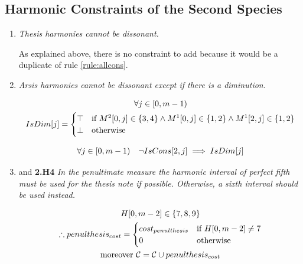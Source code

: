 \subsection*{Harmonic Constraints of the Second Species}
\begin{enumerate}[wide, label=\bfseries 2.H\arabic*]
\item\label{rule:consthesis}{ \textit{Thesis harmonies cannot be dissonant.}}

As explained above, there is no constraint to add because it would be a duplicate of rule \ref{rule:allcons}.

\item\label{rule:arsisdim}{\textit{Arsis harmonies cannot be dissonant except if there is a diminution.}}

\begin{equation}
    \begin{gathered}
        \forall j \in [0, m-1)\\
        IsDim[j] = \begin{cases}
            \top & \text{if } M^2[0, j] \in \{3, 4\} \land M^1[0, j] \in \{1, 2\} \land M^1[2, j] \in \{1, 2\}\\
            \bot & \text{otherwise}
        \end{cases}
    \end{gathered}
\end{equation}

\begin{equation}
    \begin{gathered}
        \forall j \in [0, m-1) \quad
        \lnot IsCons[2, j] \implies IsDim[j]
    \end{gathered}
\end{equation}

\item\label{rule:penult2nd} \label{rule:penultexception}{and \textbf{2.H4} \textit{In the penultimate measure the harmonic interval of perfect fifth must be used for the thesis note if possible. Otherwise, a sixth interval should be used instead.}}
\addtocounter{enumi}{1}

\begin{equation}
    \begin{gathered}
        H[0, m-2] \in \{7, 8, 9\}\\
        \therefore penulthesis_{cost} = \begin{cases}
            cost_{penulthesis} & \text{if } H[0, m-2] \neq 7\\
            0 & \text{otherwise}
        \end{cases}\\
        \text{moreover } \mathcal{C} = \mathcal{C} \cup penulthesis_{cost}
    \end{gathered}
\end{equation}


\end{enumerate}
